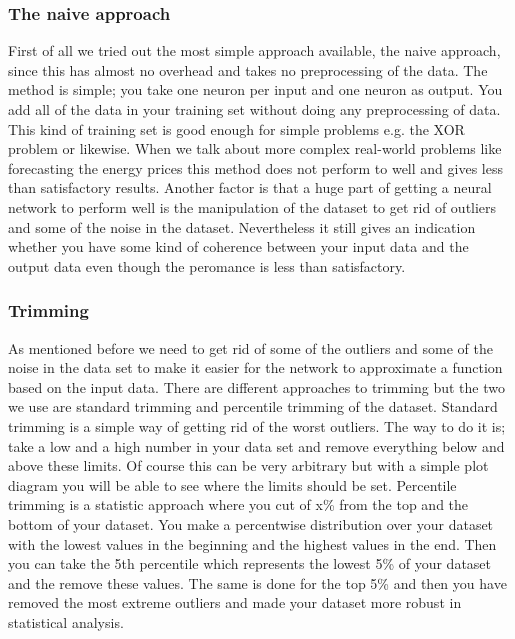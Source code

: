 \subsubsection{The naive approach}
First of all we tried out the most simple approach available, the naive approach, since this has almost no overhead and takes no preprocessing of the data. The method is simple; you take one neuron per input and one neuron as output. You add all of the data in your training set without doing any preprocessing of data. This kind of training set is good enough for simple problems e.g. the XOR problem or likewise. When we talk about more complex real-world problems like forecasting the energy prices this method does not perform to well and gives less than satisfactory results. Another factor is that a huge part of getting a neural network to perform well is the manipulation of the dataset to get rid of outliers and some of the noise in the dataset. Nevertheless it still gives an indication whether you have some kind of coherence between your input data and the output data even though the peromance is less than satisfactory. 

\subsubsection{Trimming}
As mentioned before we need to get rid of some of the outliers and some of the noise in the data set to make it easier for the network to approximate a function based on the input data. There are different approaches to trimming but the two we use are standard trimming and percentile trimming of the dataset. Standard trimming is a simple way of getting rid of the worst outliers. The way to do it is; take a low and a high number in your data set and remove everything below and above these limits. Of course this can be very arbitrary but with a simple plot diagram you will be able to see where the limits should be set. Percentile trimming is a statistic approach where you cut of x\% from the top and the bottom of your dataset. You make a percentwise distribution over your dataset with the lowest values in the beginning and the highest values in the end. Then you can take the 5th percentile which represents the lowest 5\% of your dataset and the remove these values. The same is done for the top 5\% and then you have removed the most extreme outliers and made your dataset more robust in statistical analysis.

